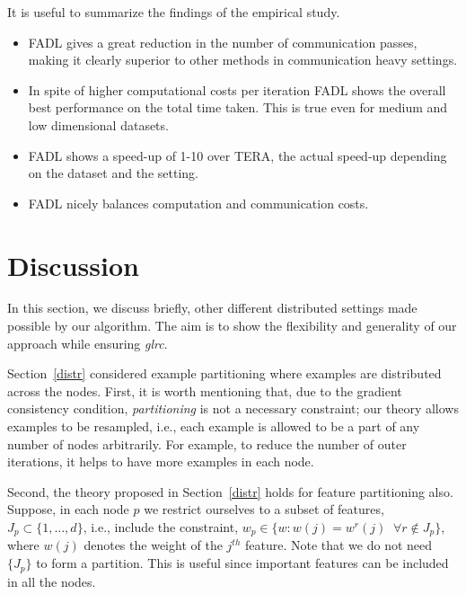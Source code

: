 \documentclass[twoside, 11pt]{article}
\begin{document}
It is useful to summarize the findings of the empirical study.
\begin{itemize}
\item FADL gives a great reduction in the number of communication passes, making it clearly superior to other methods in communication heavy settings.
\item In spite of higher computational costs per iteration FADL shows the overall best performance on the total time taken. This is true even for medium and low dimensional datasets.
\item FADL shows a speed-up of 1-10 over TERA, the actual speed-up depending on the dataset and the setting.
\item FADL nicely balances computation and communication costs.
\end{itemize}







%
%

\section{Discussion}
\label{disc}

In this section, we discuss briefly, other different distributed settings made possible by our algorithm. The aim is to show the flexibility and generality of our approach while ensuring {\it glrc}.

Section~\ref{distr} considered example partitioning where examples are distributed across the nodes. First, it is worth mentioning that, due to the gradient consistency condition, {\it partitioning} is not a necessary constraint; our theory allows examples to be resampled, i.e., each example is allowed to be a part of any number of nodes arbitrarily. For example, to reduce the number of outer iterations, it helps to have more examples in each node.

Second, the theory proposed in Section~\ref{distr} holds for feature partitioning also. Suppose, in each node $p$ we restrict ourselves to a subset of features, $J_p\subset \{1,\ldots,d\}$, i.e., include the constraint,
$w_p \in  \{ w: w(j)=w^r(j) \;\; \forall r\not\in J_p\}$,
where $w(j)$ denotes the weight of the $j^{th}$ feature. Note that we do not need $\{J_p\}$ to form a partition. This is useful since important features can be included in all the nodes.
\end{document}
